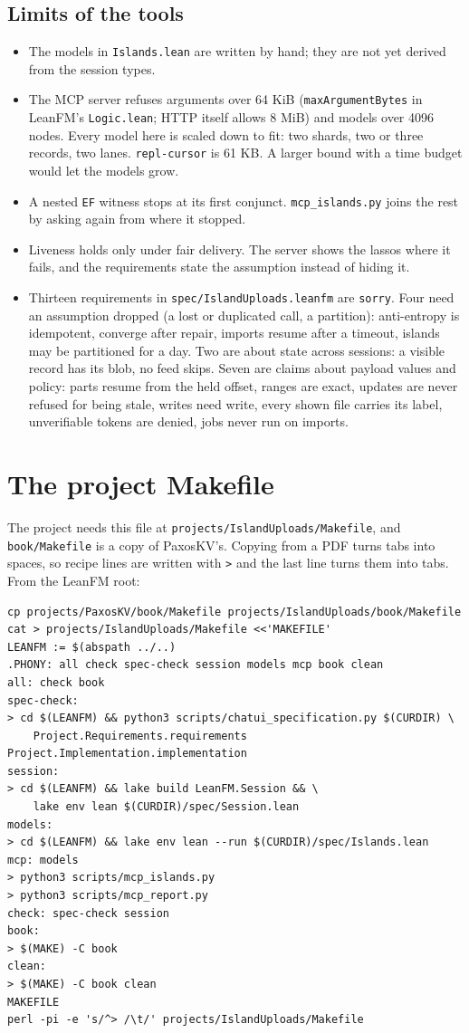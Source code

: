 \section{Limits of the tools}
\begin{itemize}\tightlist
\item The models in \texttt{Islands.lean} are written by hand; they are not yet
  derived from the session types.
\item The MCP server refuses arguments over 64 KiB (\texttt{maxArgumentBytes} in
  LeanFM's \texttt{Logic.lean}; HTTP itself allows 8 MiB) and models over 4096
  nodes. Every model here is scaled down to fit: two shards, two or three
  records, two lanes. \texttt{repl-cursor} is 61 KB. A larger bound with a time
  budget would let the models grow.
\item A nested \texttt{EF} witness stops at its first conjunct.
  \texttt{mcp\_islands.py} joins the rest by asking again from where it stopped.
\item Liveness holds only under fair delivery. The server shows the lassos where
  it fails, and the requirements state the assumption instead of hiding it.
\item Thirteen requirements in \texttt{spec/IslandUploads.leanfm} are
  \texttt{sorry}. Four need an assumption dropped (a lost or duplicated call, a
  partition): anti-entropy is idempotent, converge after repair, imports resume
  after a timeout, islands may be partitioned for a day. Two are about state
  across sessions: a visible record has its blob, no feed skips. Seven are claims about
  payload values and policy: parts resume from the held offset, ranges are
  exact, updates are never refused for being stale, writes need write, every
  shown file carries its label, unverifiable tokens are denied, jobs never run
  on imports.
\end{itemize}

\appendix
\chapter{The project Makefile}
The project needs this file at \texttt{projects/IslandUploads/Makefile}, and
\texttt{book/Makefile} is a copy of PaxosKV's. Copying from a PDF turns tabs into
spaces, so recipe lines are written with \texttt{>} and the last line turns
them into tabs. From the LeanFM root:
\begin{Verbatim}[fontsize=\small]
cp projects/PaxosKV/book/Makefile projects/IslandUploads/book/Makefile
cat > projects/IslandUploads/Makefile <<'MAKEFILE'
LEANFM := $(abspath ../..)
.PHONY: all check spec-check session models mcp book clean
all: check book
spec-check:
> cd $(LEANFM) && python3 scripts/chatui_specification.py $(CURDIR) \
    Project.Requirements.requirements Project.Implementation.implementation
session:
> cd $(LEANFM) && lake build LeanFM.Session && \
    lake env lean $(CURDIR)/spec/Session.lean
models:
> cd $(LEANFM) && lake env lean --run $(CURDIR)/spec/Islands.lean
mcp: models
> python3 scripts/mcp_islands.py
> python3 scripts/mcp_report.py
check: spec-check session
book:
> $(MAKE) -C book
clean:
> $(MAKE) -C book clean
MAKEFILE
perl -pi -e 's/^> /\t/' projects/IslandUploads/Makefile
\end{Verbatim}
